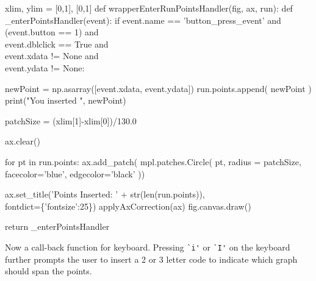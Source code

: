 \nwenddocs{}\plusendmoddef\nwstartdeflinemarkup{}\nwenddeflinemarkup
xlim, ylim = [0,1], [0,1]
def wrapperEnterRunPointsHandler(fig, ax, run):
    def _enterPointsHandler(event):
        if event.name      == 'button_press_event'     and \\
           (event.button   == 1)                       and \\
            event.dblclick == True                     and \\
            event.xdata  != None                       and \\
            event.ydata  != None:

             newPoint = np.asarray([event.xdata, event.ydata])
             run.points.append( newPoint  )
             print("You inserted ", newPoint)

             patchSize  = (xlim[1]-xlim[0])/130.0
                   
             ax.clear()

             for pt in run.points:
                  ax.add_patch( mpl.patches.Circle( pt, radius = patchSize,
                                                    facecolor='blue', edgecolor='black'  ))

             ax.set_title('Points Inserted: ' + str(len(run.points)), \\
                           fontdict=\{'fontsize':25\})
             applyAxCorrection(ax)
             fig.canvas.draw()

    return _enterPointsHandler
\nwendcode{}\nwdocspar

Now a call-back function for keyboard. Pressing \verb|`i'| or \verb|`I'| on the keyboard further prompts the 
user to insert a 2 or 3 letter code to indicate which graph should span the points. 

